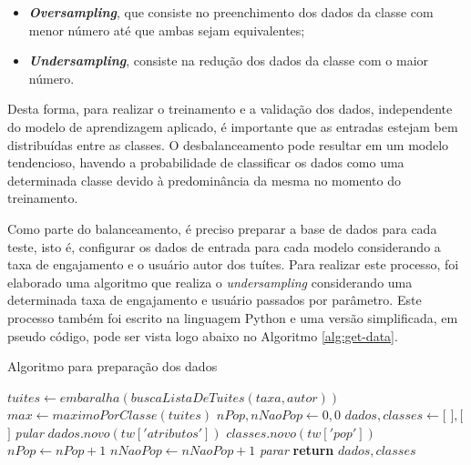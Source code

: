 \documentclass[oneside,openright,12pt]{ufsm_2015} %
\begin{document}
    \begin{itemize}
        \item \textbf{\textit{Oversampling}}, que consiste no preenchimento dos dados da classe com menor número até que ambas sejam equivalentes;
        \item \textbf{\textit{Undersampling}}, consiste na redução dos dados da classe com o maior número.
    \end{itemize}
    
    \par Desta forma, para realizar o treinamento e a validação dos dados, independente do modelo de aprendizagem aplicado, é importante que as entradas estejam bem distribuídas entre as classes. O desbalanceamento pode resultar em um modelo tendencioso, havendo a probabilidade de classificar os dados como uma determinada classe devido à predominância da mesma no momento do treinamento.

    \par Como parte do balanceamento, é preciso preparar a base de dados para cada teste, isto é, configurar os dados de entrada para cada modelo considerando a taxa de engajamento e o usuário autor dos tuítes. Para realizar este processo, foi elaborado uma algoritmo que realiza o \textit{undersampling} considerando uma determinada taxa de engajamento e usuário passados por parâmetro. Este processo também foi escrito na linguagem Python e uma versão simplificada, em pseudo código, pode ser vista logo abaixo no Algoritmo \ref{alg:get-data}.
    
    \begin{algorithm}[ht]
    \caption{Algoritmo para preparação dos dados}
    \label{alg:get-data}
    \begin{algorithmic}[1]
        \State $tuites \gets embaralha(buscaListaDeTuites(taxa, autor))$
        \State 
        \State $max \gets maximoPorClasse(tuites)$
        \State $nPop, nNaoPop \gets 0, 0$
        \State $dados, classes \gets [$ $], [$ $]$
        \State
                \State \textit{pular}
            \EndIf
            \State $dados.novo(tw['atributos'])$
            \State $classes.novo(tw['pop'])$
                \State $nPop \gets nPop + 1$
            \Else
                \State $nNaoPop \gets nNaoPop + 1$
            \EndIf
                \State \textit{parar}
            \EndIf
        \EndFor
        \State \textbf{return} $dados, classes$
        \EndFunction
    \end{algorithmic}
    \end{algorithm}
    
\end{document}
